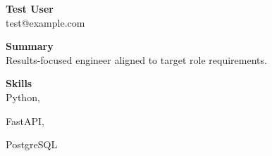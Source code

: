 \documentclass[11pt]{article}
\begin{document}
{\LARGE \textbf{ Test User }}\\
test@example.com  

\vspace{8pt}
\textbf{Summary}\\
Results-focused engineer aligned to target role requirements.

\vspace{8pt}
\textbf{Skills}\\

Python, 

FastAPI, 

PostgreSQL
\end{document}
